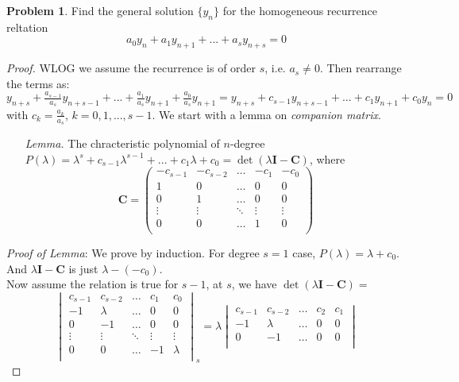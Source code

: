 \documentclass[a4paper, 10pt]{article}
\theoremstyle{definition}
\newtheorem{problem}{Problem}
\theoremstyle{hSol}
\begin{document}
\begin{problem} Find the general solution $\{y_n\}$ for the homogeneous recurrence reltation
$$
a_0 y_n + a_1 y_{n+1} + ... + a_s y_{n+s} = 0
$$
\end{problem}
\begin{proof} WLOG we assume the recurrence is of order $s$, i.e. $a_s \ne 0$. Then rearrange the terms as:
$$
y_{n+s} + \tfrac{a_{s-1}}{a_s} y_{n+s-1} + ... + \tfrac{a_{1}}{a_s} y_{n+1} + \tfrac{a_{0}}{a_s} y_{n+1} = y_{n+s} + c_{s-1}y_{n+s-1} + ... + c_1 y_{n+1} + c_0 y_{n} = 0
$$
with $c_k=\frac{a_k}{a_s}$, $k=0,1,...,s-1$.
We start with a lemma on \emph{companion matrix}.
\begin{itemize}
  \item[\textit{Lemma.}] The chracteristic polynomial of $n$-degree $P(\lambda)=\lambda^s + c_{s-1}\lambda^{s-1}+...+c_1 \lambda + c_0 = \det(\lambda \bm{I} - \bm{C})$, where 
  $$
  \bm{C} = \begin{pmatrix}
    -c_{s-1} & -c_{s-2} & \hdots & -c_1 & -c_0 \\
    1 & 0 & \hdots & 0 & 0\\
    0 & 1 & \hdots & 0 & 0\\
    \vdots & \vdots & \ddots & \vdots & \vdots\\
    0 & 0 & \hdots & 1 & 0\\
  \end{pmatrix}
  $$
\end{itemize}
\emph{Proof of Lemma}: We prove by induction. For degree $s=1$ case, $P(\lambda) = \lambda + c_0$. And $\lambda \bm{I} - \bm{C}$ is just $\lambda - (-c_0)$. \\
Now assume the relation is true for $s-1$, at $s$, we have $\det(\lambda\bm{I} - \bm{C}) = $
$$
\begin{vmatrix}
    c_{s-1} & c_{s-2} & \hdots & c_1 & c_0 \\
    -1 & \lambda & \hdots & 0 & 0\\
    0 & -1 & \hdots & 0 & 0\\
    \vdots & \vdots & \ddots & \vdots & \vdots\\
    0 & 0 & \hdots & -1 & \lambda\\
\end{vmatrix}_{s} = \lambda \begin{vmatrix}
    c_{s-1} & c_{s-2} & \hdots & c_2 & c_1 \\
    -1 & \lambda & \hdots & 0 & 0\\
    0 & -1 & \hdots & 0 & 0\\

\end{vmatrix}$$
\end{proof}
\end{document}
